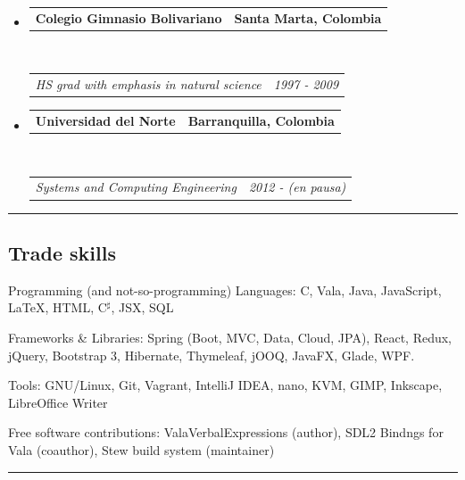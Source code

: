 \documentclass[10pt,a4paper]{article}
\makeatletter
\newenvironment{indentsection}[1]%
{\begin{list}{}%
	{\setlength{\leftmargin}{#1}}%
	\item[]%
}
{\end{list}}
\newcommand{\headerrow}[2]
{\begin{tabular*}{\linewidth}{l@{\extracolsep{\fill}}r}
	#1 &
	#2 \\
\end{tabular*}}
\makeatother
\begin{document}
\begin{itemize}
	\parskip=0.1em

	\item 
	\headerrow
		{\textbf{Colegio Gimnasio Bolivariano}}
		{\textbf{Santa Marta, Colombia}}
	\\
	\headerrow
		{\emph{HS grad with emphasis in natural science}}
		{\emph{1997 - 2009}}

	\item 
	\headerrow
	{\textbf{Universidad del Norte}}
	{\textbf{Barranquilla, Colombia}}
	\\
	\headerrow
	{\emph{Systems and Computing Engineering}}
	{\emph{2012 - (en pausa)}}
	
\end{itemize}


\hrule
\vspace{-0.4em}
\subsection*{Trade skills}

\begin{indentsection}{\parindent}
\begin{description*}
	\item[Programming (and not-so-programming) Languages:]
	C, Vala, Java, JavaScript, \LaTeX, HTML, C{$^\sharp$}, JSX, SQL
	\item[Frameworks \& Libraries:]
	Spring (Boot, MVC, Data, Cloud, JPA), React, Redux, jQuery, Bootstrap 3, Hibernate, Thymeleaf, jOOQ, JavaFX, Glade, WPF.
	\item[Tools:]
	GNU/Linux, Git, Vagrant, IntelliJ IDEA, nano, KVM, GIMP, Inkscape, LibreOffice Writer
	\item[Free software contributions:]
	ValaVerbalExpressions (author), SDL2 Bindngs for Vala (coauthor), Stew build system (maintainer)
\end{description*}
\end{indentsection}
\hrule
\vspace{-0.4em}
\end{document}

